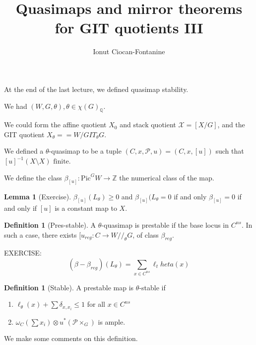 \documentclass{amsart}
\title{Quasimaps and mirror theorems for GIT quotients III}
\author{Ionut Ciocan-Fontanine}
\theoremstyle{definition}
\newtheorem{definition}[dummy]{Definition}
\newtheorem{lemma}[dummy]{Lemma}
\newcommand{\Z}{\mathbb{Z}}
\newcommand{\GIT}{//}
\begin{document}
\maketitle

At the end of the last lecture, we defined quasimap stability.

We had $(W,G,\theta), \theta\in\chi(G)_\mathbb{Q}$.

We could form the affine quotient $X_0$ and stack quotient $\mathcal{X}=[X/G]$, and the GIT quotient $X_\theta==W/GIT_\theta G$.

We defined a $\theta$-quasimap to be a tuple $(C,x,\mathcal{P},u)=(C, x, [u])$ such that $[u]^{-1}(X\setminus X) \text{ finite}$.

We define the class $\beta_{[u]}: \text{Pic}^G W\to \Z$ the numerical class of the map.

\begin{lemma}[Exercise]
$\beta_{[u]}(L_\theta)\geq 0$ and $\beta_{[u]}(L_\theta=0$ if and only $\beta_{[u]}=0$ if and only if $[u]$ is a constant map to $X$.
\end{lemma}

\begin{definition}[Pres-stable]
A $\theta$-quasimap is prestable if the base locus in $C^{ns}$.  In such a case, there exists $[u_{reg}:C\to W\GIT_\theta G$, of class $\beta_{reg}$.
\end{definition}

EXERCISE: $$(\beta-\beta_{reg})(L_\theta)=\sum_{x\in C^{ns}} \ell_theta(x)$$

\begin{definition}[Stable]
A prestable map is $\theta$-stable if
\begin{enumerate}
\item $\ell_\theta(x)+\sum \delta_{x,x_i}\leq 1$ for all $x\in C^{ns}$
\item $\omega_C(\sum x_i)\otimes u^*(\mathcal{P}\times_G)$ is ample.
\end{enumerate}
\end{definition}
We make some comments on this definition.
\end{document}
